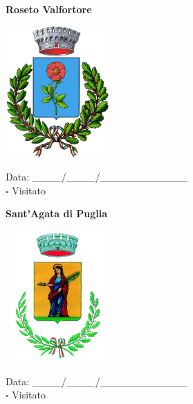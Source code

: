 \documentclass[a5paper,12pt]{article}
\begin{document}
\vspace{0.7cm}

\noindent
\begin{minipage}[t]{0.45\textwidth}
    \begin{center}
        \textbf{Roseto Valfortore}
    \end{center}
    \vspace{-0.5cm} %
    \begin{center}
        \includegraphics[height= 5cm, width=4cm]{Puglia/Stemma Roseto Valfortore.png}
    \end{center}
    \vspace{-0.4cm} %
    \begin{flushleft}
        Data: \_\_\_\_/\_\_\_\_/\_\_\_\_\_\_\_\_\_\_\_\_ \\
        $\square$ Visitato
    \end{flushleft}
\end{minipage}
\hfill
\noindent
\begin{minipage}[t]{0.45\textwidth}
    \begin{center}
        \textbf{Sant'Agata di Puglia}
    \end{center}
    \vspace{-0.5cm} %
    \begin{center}
        \includegraphics[height= 5cm, width=4cm]{Puglia/Stemma Sant'Agata di Puglia.png}
    \end{center}
    \vspace{-0.4cm} %
    \begin{flushleft}
        Data: \_\_\_\_/\_\_\_\_/\_\_\_\_\_\_\_\_\_\_\_\_ \\
        $\square$ Visitato
    \end{flushleft}
\end{minipage}
\end{document}

